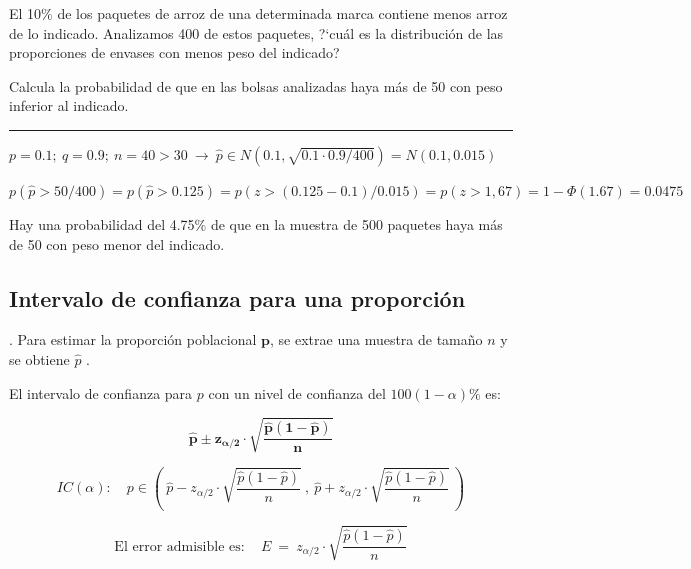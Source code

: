 \begin{ejemplo}
\begin{ejre}
El 10\% de los paquetes de arroz de una determinada marca contiene menos arroz de lo indicado. Analizamos 400 de estos paquetes, ?`cuál es la distribución de las proporciones de envases con menos peso del indicado?

\vspace{2mm} Calcula la probabilidad de que en las bolsas  analizadas haya más de 50 con peso inferior al indicado.

\rule{150pt}{0.1pt}

\vspace{2mm} $p=0.1;\ q=0.9;\ n=40>30 \ \to \ \widehat p \in N(0.1,\sqrt{0.1\cdot 0.9/400})=N(0.1,0.015)$

\vspace{2mm} $p(\widehat p>50/400)=p(\widehat p>0.125)=p(z>(0.125-0.1)/0.015)=p(z>1,67)=1-\Phi(1.67)=0.0475$

\vspace{2mm} Hay una probabilidad del 4.75\% de que en la muestra de 500 paquetes haya más de 50 con peso menor del indicado.
	
\end{ejre}	
\end{ejemplo}


\subsection{Intervalo de confianza para una proporción}

\begin{theorem}
.	Para estimar  la proporción poblacional $\boldsymbol{p}$, se extrae una muestra de tamaño  $n$  y se obtiene  $\widehat p$ .   

\vspace{2mm} El intervalo de confianza para   $p$  con un nivel de confianza del $100(1-\alpha)\%$  es:  	

$$\boldsymbol{ \widehat p \pm z_{\alpha/2}\cdot \sqrt{{\dfrac{\hat p(1-\hat p)}{n}}} }$$


$$ IC(\alpha):\quad p\in  \left( \  \widehat p - z_{\alpha/2}\cdot \sqrt{{\dfrac{\hat p(1-\hat p)}{n}}} \ , \   \widehat p + z_{\alpha/2}\cdot \sqrt{{\dfrac{\hat p(1-\hat p)}{n}} } \  \right) $$

$$\text{El error admisible es}:\quad E\ = \ z_{\alpha/2}\cdot \sqrt{{\dfrac{\hat p(1-\hat p)}{n}}} $$
\end{theorem}

